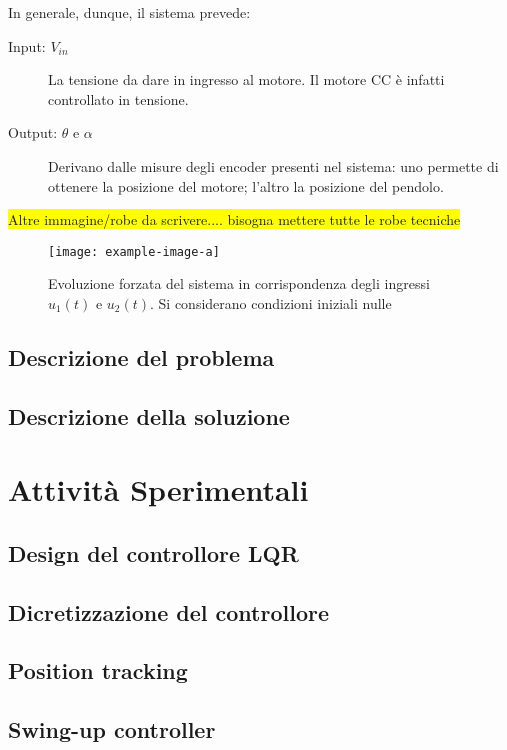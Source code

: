 \documentclass[11pt]{article}
\begin{document}
In generale, dunque, il sistema prevede:
\begin{description}
    \item [Input: $V_{in}$] La tensione da dare in ingresso al motore. Il motore CC è infatti controllato in tensione.
    \item [Output: $\theta$ e $\alpha$] Derivano dalle misure degli encoder presenti nel sistema: uno permette di ottenere la posizione del motore; l'altro la posizione del pendolo.
\end{description}

\colorbox{yellow}{Altre immagine/robe da scrivere.... bisogna mettere tutte le robe tecniche} 


\begin{figure}[H]
	\centering
	\texttt{[image: example-image-a]}
	\caption{Evoluzione forzata del sistema in corrispondenza degli ingressi $u_1(t)$ e $u_2(t)$. Si considerano condizioni iniziali nulle}
	\label{fig:1}
\end{figure}









\subsection{Descrizione del problema}




\subsection{Descrizione della soluzione}




\section{Attività Sperimentali}

\subsection{Design del controllore LQR}
\subsection{Dicretizzazione del controllore}
\subsection{Position tracking}
\subsection{Swing-up controller}
\end{document}

